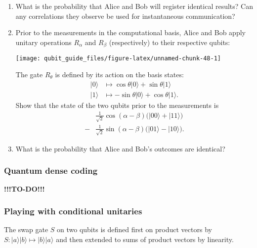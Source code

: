 \documentclass[fleqn]{article}
\begin{document}
\begin{enumerate}
\def\labelenumi{\arabic{enumi}.}
\item
  What is the probability that Alice and Bob will register identical results?
  Can any correlations they observe be used for instantaneous communication?
\item
  Prior to the measurements in the computational basis, Alice and Bob apply unitary operations \(R_\alpha\) and \(R_\beta\) (respectively) to their respective qubits:

  \begin{center}\texttt{[image: qubit\_guide\_files/figure-latex/unnamed-chunk-48-1]} \end{center}

  The gate \(R_\theta\) is defined by its action on the basis states:
  \[
     \begin{aligned}
       |0\rangle
       &\longmapsto
       \cos\theta|0\rangle + \sin\theta|1\rangle
     \\|1\rangle
       &\longmapsto
       -\sin\theta|0\rangle + \cos\theta|1\rangle.
     \end{aligned}
   \]
  Show that the state of the two qubits prior to the measurements is
  \[
     \begin{aligned}
       &\frac{1}{\sqrt2}\cos(\alpha-\beta)\big( |00\rangle + |11\rangle \big)
     \\- &\frac{1}{\sqrt2}\sin(\alpha-\beta)\big( |01\rangle - |10\rangle \big).
     \end{aligned}
   \]
\item
  What is the probability that Alice and Bob's outcomes are identical?
\end{enumerate}

\hypertarget{quantum-dense-coding}{%
\subsubsection{Quantum dense coding}\label{quantum-dense-coding}}

\textbf{!!!TO-DO!!!}

\hypertarget{playing-with-conditional-unitaries}{%
\subsubsection{Playing with conditional unitaries}\label{playing-with-conditional-unitaries}}

The swap gate \(S\) on two qubits is defined first on product vectors by \(S\colon|a\rangle|b\rangle\mapsto|b\rangle|a\rangle\) and then extended to sums of product vectors by linearity.
\end{document}
